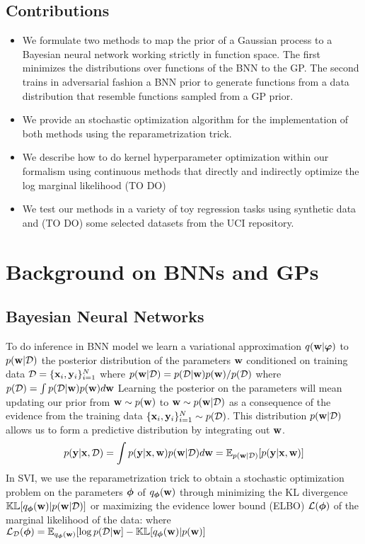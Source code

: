\documentclass{article}
\begin{document}
\subsection{Contributions}
\begin{itemize}
    \item We formulate two methods to map the prior of a Gaussian process to a Bayesian neural network 
          working strictly in function space. The first minimizes the distributions over functions of 
          the BNN to the GP. The second trains in adversarial fashion a BNN prior to generate functions
          from a data distribution that resemble functions sampled from a GP prior.
    \item We provide an stochastic optimization algorithm for the implementation of both methods using the
          reparametrization trick.  
    \item We describe how to do kernel hyperparameter optimization within our formalism using 
          continuous methods that directly and indirectly optimize the log marginal likelihood (TO DO)
    \item We test our methods in a variety of toy regression tasks using synthetic data and (TO DO)
          some selected datasets from the UCI repository. 
    
\end{itemize}

\newpage

\section{Background on BNNs and GPs}

\subsection{Bayesian Neural Networks}
To do inference in BNN model we learn a variational approximation $q( \mathbf{w}  |\bm \varphi )$ to 
$ p( \mathbf{w}  | \mathcal{D} )$ the posterior distribution of the parameters $ \mathbf{w} $ conditioned on training data 
$\mathcal{D} =\{ \mathbf{x} _i,   \mathbf{y} _i\}_{i=1}^N $ 
where $p( \mathbf{w}  |\mathcal{D})= p(\mathcal{D} | \mathbf{w} ) p( \mathbf{w} ) / p(\mathcal{D}) $ 
where  $ p(\mathcal{D}) =\int p(\mathcal{D} | \mathbf{w} ) p( \mathbf{w} ) d \mathbf{w}  $
Learning the posterior on the parameters will mean updating our prior from 
$ \mathbf{w}  \sim p( \mathbf{w} )$ to $ \mathbf{w}  \sim p( \mathbf{w} |\mathcal{D})$ as a consequence of the evidence from the training data     
$ \{ \mathbf{x} _i,   \mathbf{y} _i\}_{i=1}^N \sim p(\mathcal{D} ) $. 
This distribution $p( \mathbf{w}  |\mathcal{D}) $ allows us to form a predictive distribution by integrating out $ \mathbf{w} $.
\[p( \mathbf{y}   |  \mathbf{x} , \mathcal{D} ) = \int p( \mathbf{y}  |  \mathbf{x} ,  \mathbf{w} ) p( \mathbf{w}  | \mathcal{D} )d \mathbf{w}  = \mathbb{E}_{p( \mathbf{w}  |\mathcal{D})}[p( \mathbf{y}  |  \mathbf{x} ,  \mathbf{w} )] \]
In SVI, we use the reparametrization trick to obtain a stochastic optimization problem on the parameters 
$\bm \phi$ of $q_{\bm \phi}( \mathbf{w} )$ through minimizing the KL divergence $\mathbb{K}\mathbb{L} [ q_{\bm \phi}( \mathbf{w} ) |p( \mathbf{w}  |\mathcal{D})   ]$ or maximizing the 
evidence lower bound (ELBO) $\mathcal{L} (\bm \phi)$ of the marginal likelihood of the data:
\eqn{ \bm \phi^*  = \argmin{\bm \phi} \ \kl [ \aq |\ap   ] = \argmax{\bm \phi} \ \elbo _\D (\bm \phi) }
where $\mathcal{L} _{\mathcal{D}} (\bm \phi) = \mathbb{E} _{q_{\bm \phi}( \mathbf{w} )}[\log p(\mathcal{D}| \mathbf{w} ] - \mathbb{K}\mathbb{L} [ q_{\bm \phi}( \mathbf{w} ) | p( \mathbf{w} )  ]  $
\end{document}
